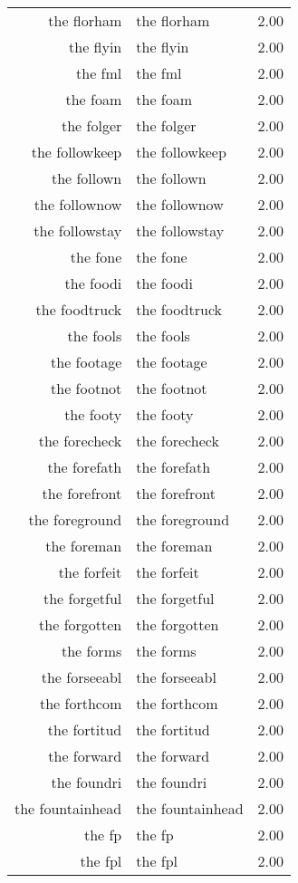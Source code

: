 \begin{table}[ht]
\begin{tabular}{rlr}
  the florham & the florham & 2.00 \\ 
  the flyin & the flyin & 2.00 \\ 
  the fml & the fml & 2.00 \\ 
  the foam & the foam & 2.00 \\ 
  the folger & the folger & 2.00 \\ 
  the followkeep & the followkeep & 2.00 \\ 
  the follown & the follown & 2.00 \\ 
  the follownow & the follownow & 2.00 \\ 
  the followstay & the followstay & 2.00 \\ 
  the fone & the fone & 2.00 \\ 
  the foodi & the foodi & 2.00 \\ 
  the foodtruck & the foodtruck & 2.00 \\ 
  the fools & the fools & 2.00 \\ 
  the footage & the footage & 2.00 \\ 
  the footnot & the footnot & 2.00 \\ 
  the footy & the footy & 2.00 \\ 
  the forecheck & the forecheck & 2.00 \\ 
  the forefath & the forefath & 2.00 \\ 
  the forefront & the forefront & 2.00 \\ 
  the foreground & the foreground & 2.00 \\ 
  the foreman & the foreman & 2.00 \\ 
  the forfeit & the forfeit & 2.00 \\ 
  the forgetful & the forgetful & 2.00 \\ 
  the forgotten & the forgotten & 2.00 \\ 
  the forms & the forms & 2.00 \\ 
  the forseeabl & the forseeabl & 2.00 \\ 
  the forthcom & the forthcom & 2.00 \\ 
  the fortitud & the fortitud & 2.00 \\ 
  the forward & the forward & 2.00 \\ 
  the foundri & the foundri & 2.00 \\ 
  the fountainhead & the fountainhead & 2.00 \\ 
  the fp & the fp & 2.00 \\ 
  the fpl & the fpl & 2.00 \\ 

\end{tabular}
\end{table}
